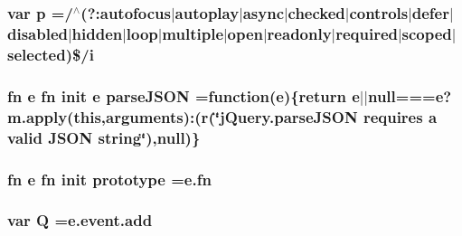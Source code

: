 \hypertarget{jquery-migrate-1_82_81_8min_8js_ad1707b001240e9c8298830073364c8bf}{
\subsubsection[{p}]{\setlength{\rightskip}{0pt plus 5cm}var p =/$^\wedge$(?\-:autofocus$\vert$autoplay$\vert$async$\vert$checked$\vert$controls$\vert$defer$\vert$disabled$\vert${\bf hidden}$\vert$loop$\vert$multiple$\vert$open$\vert$readonly$\vert$required$\vert$scoped$\vert$selected)\$/{\bf i}}}\label{jquery-migrate-1_82_81_8min_8js_ad1707b001240e9c8298830073364c8bf}
\hypertarget{jquery-migrate-1_82_81_8min_8js_a78744aa01b6245cc7f2a7fedfe14a390}{
\subsubsection[{parse\-J\-S\-O\-N}]{ {\bf fn} {\bf e} {\bf fn} {\bf init} {\bf e} parse\-J\-S\-O\-N =function({\bf e})\{return {\bf e}$\vert$$\vert$null==={\bf e}?m.\-apply(this,arguments)\-:({\bf r}(\char`\"{}j\-Query.\-parse\-J\-S\-O\-N requires {\bf a} valid J\-S\-O\-N string\char`\"{}),null)\}}}\label{jquery-migrate-1_82_81_8min_8js_a78744aa01b6245cc7f2a7fedfe14a390}
\hypertarget{jquery-migrate-1_82_81_8min_8js_a58b9d909b30dda5f8f279e559872ab72}{
\subsubsection[{prototype}]{ {\bf fn} {\bf e} {\bf fn} {\bf init} prototype ={\bf e.\-fn}}}\label{jquery-migrate-1_82_81_8min_8js_a58b9d909b30dda5f8f279e559872ab72}
\hypertarget{jquery-migrate-1_82_81_8min_8js_a044ff3ae9eca11d4603780243cdfc911}{
\subsubsection[{Q}]{\setlength{\rightskip}{0pt plus 5cm}var Q ={\bf e.\-event.\-add}}}\label{jquery-migrate-1_82_81_8min_8js_a044ff3ae9eca11d4603780243cdfc911}

